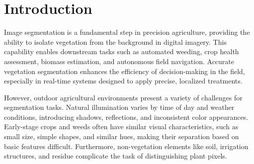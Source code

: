 \documentclass[agriculture,article,submit,pdftex,moreauthors]{Definitions/mdpi}
\begin{document}
%


\section{Introduction}
Image segmentation is a fundamental step in precision agriculture, providing the ability to isolate vegetation from the background in digital imagery. This capability enables downstream tasks such as automated weeding, crop health assessment, biomass estimation, and autonomous field navigation. Accurate vegetation segmentation enhances the efficiency of decision-making in the field, especially in real-time systems designed to apply precise, localized treatments.

However, outdoor agricultural environments present a variety of challenges for segmentation tasks. Natural illumination varies by time of day and weather conditions, introducing shadows, reflections, and inconsistent color appearances. Early-stage crops and weeds often have similar visual characteristics, such as small size, simple shapes, and similar hues, making their separation based on basic features difficult. Furthermore, non-vegetation elements like soil, irrigation structures, and residue complicate the task of distinguishing plant pixels.
\end{document}

